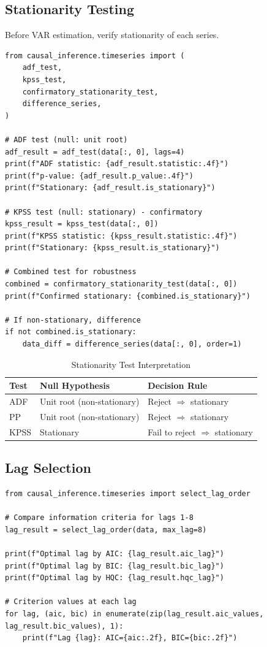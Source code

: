 \subsection{Stationarity Testing}

Before VAR estimation, verify stationarity of each series.

\begin{verbatim}
from causal_inference.timeseries import (
    adf_test,
    kpss_test,
    confirmatory_stationarity_test,
    difference_series,
)

# ADF test (null: unit root)
adf_result = adf_test(data[:, 0], lags=4)
print(f"ADF statistic: {adf_result.statistic:.4f}")
print(f"p-value: {adf_result.p_value:.4f}")
print(f"Stationary: {adf_result.is_stationary}")

# KPSS test (null: stationary) - confirmatory
kpss_result = kpss_test(data[:, 0])
print(f"KPSS statistic: {kpss_result.statistic:.4f}")
print(f"Stationary: {kpss_result.is_stationary}")

# Combined test for robustness
combined = confirmatory_stationarity_test(data[:, 0])
print(f"Confirmed stationary: {combined.is_stationary}")

# If non-stationary, difference
if not combined.is_stationary:
    data_diff = difference_series(data[:, 0], order=1)
\end{verbatim}

\begin{table}[h]
\centering
\caption{Stationarity Test Interpretation}
\begin{tabular}{lll}
\toprule
Test & Null Hypothesis & Decision Rule \\
\midrule
ADF & Unit root (non-stationary) & Reject $\Rightarrow$ stationary \\
PP & Unit root (non-stationary) & Reject $\Rightarrow$ stationary \\
KPSS & Stationary & Fail to reject $\Rightarrow$ stationary \\
\bottomrule
\end{tabular}
\end{table}

\subsection{Lag Selection}

\begin{verbatim}
from causal_inference.timeseries import select_lag_order

# Compare information criteria for lags 1-8
lag_result = select_lag_order(data, max_lag=8)

print(f"Optimal lag by AIC: {lag_result.aic_lag}")
print(f"Optimal lag by BIC: {lag_result.bic_lag}")
print(f"Optimal lag by HQC: {lag_result.hqc_lag}")

# Criterion values at each lag
for lag, (aic, bic) in enumerate(zip(lag_result.aic_values, lag_result.bic_values), 1):
    print(f"Lag {lag}: AIC={aic:.2f}, BIC={bic:.2f}")
\end{verbatim}

